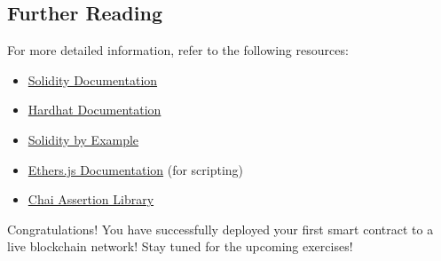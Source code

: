 \documentclass[12pt]{article}
\begin{document}
\subsection{Further Reading}

For more detailed information, refer to the following resources:

\begin{itemize}
    \item \href{https://docs.soliditylang.org/en/latest/}{Solidity Documentation}
    \item \href{https://hardhat.org/docs}{Hardhat Documentation}
    \item \href{https://solidity-by-example.org/}{Solidity by Example}
    \item \href{https://docs.ethers.org/v6/}{Ethers.js Documentation} (for scripting)
    \item \href{https://www.chaijs.com/}{Chai Assertion Library}

\end{itemize}
Congratulations! You have successfully deployed your first smart contract to a live blockchain network! Stay tuned for the upcoming exercises!
\end{document}
